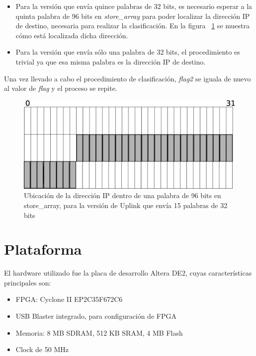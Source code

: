 \begin{itemize}
	\item Para la versión que envía quince palabras de 32 bits, es necesario esperar a la quinta palabra de 96 bits en \textit{store\_array} para poder localizar la dirección IP de destino, necesaria para realizar la clasificación. En la figura ~\ref{fig:ip15pal} se muestra cómo está localizada dicha dirección. 
	\item Para la versión que envía sólo una palabra de 32 bits, el procedimiento es trivial ya que esa misma palabra es la dirección IP de destino.
\end{itemize}


Una vez llevado a cabo el procedimiento de clasificación, \textit{flag2} se iguala de nuevo al valor de \textit{flag }y el proceso se repite.


\begin{figure}[H]
  \centering
	\includegraphics[scale=0.30]{4-implementacion/graf/ip15pal.eps}
  \caption{Ubicación de la dirección IP dentro de una palabra de 96 bits en store\_array, para la versión de Uplink que envía 15 palabras de 32 bits}
  \label{fig:ip15pal}
\end{figure}


\section{Plataforma}

El hardware utilizado fue la placa de desarrollo Altera DE2, cuyas características principales son:

\begin{itemize}
	\item FPGA: Cyclone II EP2C35F672C6
	\item USB Blaster integrado, para configuración de FPGA
	\item Memoria: 8 MB SDRAM, 512 KB SRAM, 4 MB Flash
	\item Clock de 50 MHz
\end{itemize}

